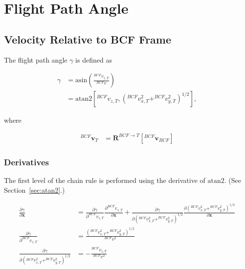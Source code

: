 \documentclass[]{article}
\newcommand{\vb}[1]{\bm{#1}} %
\newcommand{\pd}[2]{\frac{\partial #1}{\partial #2}} %
\begin{document}

\section{Flight Path Angle}


\subsection{Velocity Relative to BCF Frame}

The flight path angle $\gamma$ is defined as

\begin{align}
	\gamma &= \mathrm{asin} \left( \frac{^{BCF} v_{z, T}}{^{BCF} v} \right) \\
	&= \mathrm{atan2} \left[ ^{BCF} v_{z, T}, \left( ^{BCF} v_{x,T}^2 + ^{BCF} v_{y, T}^2 \right)^{1/2} \right],
\end{align}

\noindent where

\begin{align}
^{BCF} \vb{v}_{T} &= \vb{R}^{BCF \rightarrow T} \left[ ^{BCF} \vb{v}_{BCF} \right]
\end{align}

\subsubsection{Derivatives}

The first level of the chain rule is performed using the derivative of $\mathrm{atan2}$. (See Section~\ref{sec:atan2}.)

\begin{align}
	\pd{\gamma}{\vb{x}} &= \pd{\gamma}{^{BCF} v_{z, T}} \pd{^{BCF} v_{z, T}}{\vb{x}} + \pd{\gamma}{ \left( ^{BCF} v_{x, T}^2 + ^{BCF} v_{y, T}^2 \right)^{1/2}} \pd{\left( ^{BCF} v_{x, T}^2 + ^{BCF} v_{y, T}^2 \right)^{1/2}}{\vb{x}} \\
	\pd{\gamma}{^{BCF} v_{z, T}} &= \frac{\left( ^{BCF} v_{x, T}^2 + ^{BCF} v_{y, T}^2 \right)^{1/2}}{^{BCF} v^2} \\
	\pd{\gamma}{ \left( ^{BCF} v_{x, T}^2 + ^{BCF} v_{y, T}^2 \right)^{1/2}} &= -\frac{^{BCF} v_{z, T}}{^{BCF} v^2}
\end{align}
\end{document}
